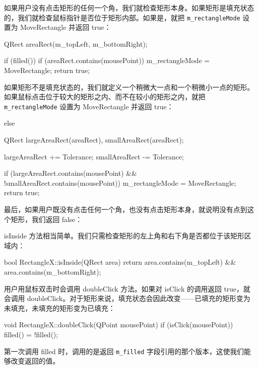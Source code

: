 如果用户没有点击矩形的任何一个角，我们就检查矩形本身。如果矩形是填充状态的，我们就检查鼠标指针是否位于矩形内部。如果是，就把 \texttt{m\_rectangleMode} 设置为 MoveRectangle 并返回 true：

\begin{codebox}
  QRect areaRect(m_topLeft, m_bottomRight);

  if (filled()) {
    if (areaRect.contains(mousePoint)) {
      m_rectangleMode = MoveRectangle;
      return true;
    }
  }
\end{codebox}

如果矩形不是填充状态的，我们就定义一个稍微大一点和一个稍微小一点的矩形。如果鼠标点击位于较大的矩形之内、而不在较小的矩形之内，就把 \texttt{m\_rectangleMode} 设置为 MoveRectangle 并返回 true：

\begin{codebox}
  else {
    QRect largeAreaRect(areaRect), smallAreaRect(areaRect);

    largeAreaRect += Tolerance;
    smallAreaRect -= Tolerance;

    if (largeAreaRect.contains(mousePoint) &&
        !smallAreaRect.contains(mousePoint)) {
      m_rectangleMode = MoveRectangle;
      return true;
    }
  }
\end{codebox}

最后，如果用户既没有点击任何一个角，也没有点击矩形本身，就说明没有点到这个矩形，我们返回 false：

\begin{codebox}
  return false;
}
\end{codebox}

isInside 方法相当简单。我们只需检查矩形的左上角和右下角是否都位于该矩形区域内：

\begin{codebox}
bool RectangleX::isInside(QRect area) {
   return area.contains(m_topLeft) &&
     area.contains(m_bottomRight);
 }
\end{codebox}

用户用鼠标双击时会调用 doubleClick 方法。如果对 isClick 的调用返回 true，就会调用 doubleClick。对于矩形来说，填充状态会因此改变——已填充的矩形变为未填充，未填充的矩形变为已填充：

\begin{codebox}
void RectangleX::doubleClick(QPoint mousePoint) {
  if (isClick(mousePoint)) {
    filled() = !filled();
  }
}
\end{codebox}

第一次调用 filled 时，调用的是返回 \texttt{m\_filled} 字段引用的那个版本，这使我们能够改变返回的值。

